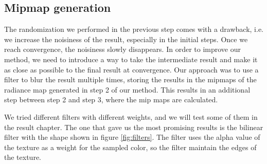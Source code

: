 \subsection{Mipmap generation}
\label{sec:mipmaps}
The randomization we performed in the previous step comes with a drawback, i.e. we increase the noisiness of the result, especially in the initial steps. Once we reach convergence, the noisiness slowly disappears. In order to improve our method, we need to introduce a way to take the intermediate result and make it as close as possible to the final result at convergence. Our approach was to use a filter to blur the result multiple times, storing the results in the mipmaps of the radiance map generated in step 2 of our method. This results in an additional step between step 2 and step 3, where the mip maps are calculated.

We tried different filters with different weights, and we will test some of them in the result chapter. The one that gave us the most promising results is the bilinear filter with the shape shown in figure \ref{fig:filters}. The filter uses the alpha value of the texture as a weight for the sampled color, so the filter maintain the edges of the texture. %

